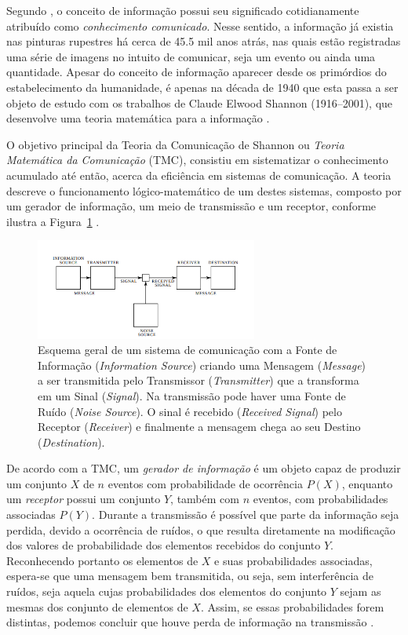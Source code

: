 \documentclass[12pt,oneside,brazil,hidelinks,article,sumario=tradicional,a4paper]{abntex2}
\begin{document}
Segundo \textcite{conceitoinformação}, o conceito de informação possui seu significado cotidianamente atribuído como \textit{conhecimento comunicado}. Nesse sentido, a informação já existia nas pinturas rupestres há cerca de \num{45,5} mil anos atrás, nas quais estão registradas uma série de imagens no intuito de comunicar, seja um evento ou ainda uma quantidade. Apesar do conceito de informação aparecer desde os primórdios do estabelecimento da humanidade, é apenas na década de 1940 que esta passa a ser objeto de estudo com os trabalhos de Claude Elwood Shannon (1916--2001), que desenvolve uma teoria matemática para a informação \cite{CiênciaTransiçãoSeculosa}.

O objetivo principal da Teoria da Comunicação de Shannon ou \textit{Teoria Matemática da Comunicação} (TMC), consistiu em sistematizar o conhecimento acumulado até então, acerca da eficiência em sistemas de comunicação. A teoria descreve o funcionamento lógico-matemático de um destes sistemas, composto por um gerador de informação, um meio de transmissão e um receptor, conforme ilustra a Figura~\ref{comunicshannon} \cite{MTC}.

\begin{figure}[ht!]
  \centering
  \caption{Esquema geral de um sistema de comunicação com a Fonte de Informação (\textit{Information Source}) criando uma Mensagem (\textit{Message}) a ser transmitida pelo Transmissor (\textit{Transmitter}) que a transforma em um Sinal (\textit{Signal}). Na transmissão pode haver uma Fonte de Ruído (\textit{Noise Source}). O sinal é recebido (\textit{Received Signal}) pelo Receptor (\textit{Receiver}) e finalmente a mensagem chega ao seu Destino (\textit{Destination}).}\label{comunicshannon}
  \includegraphics[width=0.65\textwidth]{comunicadorshannon.png}
\end{figure}

De acordo com  a TMC, um \textit{gerador de informação} é um objeto capaz de produzir um conjunto $X$ de $n$ eventos com probabilidade de ocorrência $P(X)$, enquanto um \textit{receptor} possui um conjunto $Y$, também com $n$ eventos, com probabilidades associadas $P(Y)$. Durante a transmissão é possível que parte da informação seja perdida, devido a ocorrência de ruídos, o que resulta diretamente na modificação dos valores de probabilidade dos elementos recebidos do conjunto $Y$. Reconhecendo portanto os elementos de $X$ e suas probabilidades associadas, espera-se que uma mensagem bem transmitida, ou seja, sem interferência de ruídos, seja aquela cujas probabilidades dos elementos do conjunto $Y$ sejam as mesmas dos conjunto de elementos de $X$. Assim, se essas probabilidades forem distintas, podemos concluir que houve perda de informação na transmissão \cite{mathematical}.
\end{document}
